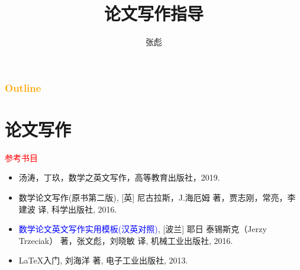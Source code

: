 \documentclass[10pt]{ctexbeamer}
\newcommand{\red}[1]{\textcolor{red}{#1}}
\newcommand{\blue}[1]{\textcolor{blue}{#1}}
\begin{document}
\title[]{论文写作指导 }
\author[]{{\large 张彪} }

\date{}


%



\begin{frame}
\maketitle
\end{frame}

\setcounter{tocdepth}{1}

\begin{frame}
    \frametitle{\textcolor{orange}{Outline}}
    \tableofcontents
\end{frame}


\section{论文写作}
\begin{frame}


\red{参考书目}
	\begin{itemize}
	\item 汤涛，丁玖，数学之英文写作，高等教育出版社，2019.

	\item  数学论文写作(原书第二版), [英] 尼古拉斯，J.海厄姆 著，贾志刚，常亮，李建波 译, 科学出版社, 2016.

	\item \blue{数学论文英文写作实用模板(汉英对照)}, [波兰] 耶日 泰锡斯克（Jerzy Trzeciak） 著，张文彪，刘晓敏 译, 机械工业出版社, 2016.

	\item LaTeX入门, 刘海洋 著, 电子工业出版社, 2013.
	\end{itemize}





\end{frame}
\end{document}
